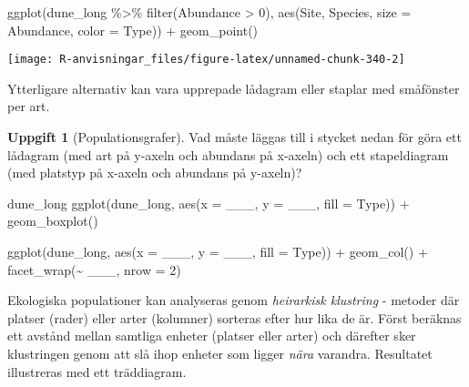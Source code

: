 \documentclass[
]{book}
\newenvironment{Shaded}{\begin{snugshade}}{\end{snugshade}}
\newcommand{\AttributeTok}[1]{\textcolor[rgb]{0.77,0.63,0.00}{#1}}
\newcommand{\DecValTok}[1]{\textcolor[rgb]{0.00,0.00,0.81}{#1}}
\newcommand{\FunctionTok}[1]{\textcolor[rgb]{0.00,0.00,0.00}{#1}}
\newcommand{\NormalTok}[1]{#1}
\newcommand{\SpecialCharTok}[1]{\textcolor[rgb]{0.00,0.00,0.00}{#1}}
\theoremstyle{definition}
\theoremstyle{definition}
\theoremstyle{definition}
\newtheorem{exercise}{Uppgift}[chapter]
\theoremstyle{definition}
\theoremstyle{remark}
\begin{document}
\begin{Shaded}
\begin{Highlighting}[]
\FunctionTok{ggplot}\NormalTok{(dune\_long }\SpecialCharTok{\%\textgreater{}\%} \FunctionTok{filter}\NormalTok{(Abundance }\SpecialCharTok{\textgreater{}} \DecValTok{0}\NormalTok{), }\FunctionTok{aes}\NormalTok{(Site, Species, }\AttributeTok{size =}\NormalTok{ Abundance, }\AttributeTok{color =}\NormalTok{ Type)) }\SpecialCharTok{+}
  \FunctionTok{geom\_point}\NormalTok{()}
\end{Highlighting}
\end{Shaded}

\begin{center}\texttt{[image: R-anvisningar\_files/figure-latex/unnamed-chunk-340-2]} \end{center}

Ytterligare alternativ kan vara upprepade lådagram eller staplar med småfönster per art.

\begin{exercise}[Populationsgrafer]

Vad måste läggas till i stycket nedan för göra ett lådagram (med art på y-axeln och abundans på x-axeln) och ett stapeldiagram (med platstyp på x-axeln och abundans på y-axeln)?

\begin{Shaded}
\begin{Highlighting}[]
\NormalTok{dune\_long}
\FunctionTok{ggplot}\NormalTok{(dune\_long, }\FunctionTok{aes}\NormalTok{(}\AttributeTok{x =}\NormalTok{ \_\_\_, }\AttributeTok{y =}\NormalTok{ \_\_\_, }\AttributeTok{fill =}\NormalTok{ Type)) }\SpecialCharTok{+}
  \FunctionTok{geom\_boxplot}\NormalTok{()}

\FunctionTok{ggplot}\NormalTok{(dune\_long, }\FunctionTok{aes}\NormalTok{(}\AttributeTok{x =}\NormalTok{ \_\_\_, }\AttributeTok{y =}\NormalTok{ \_\_\_, }\AttributeTok{fill =}\NormalTok{ Type)) }\SpecialCharTok{+}
  \FunctionTok{geom\_col}\NormalTok{() }\SpecialCharTok{+}
  \FunctionTok{facet\_wrap}\NormalTok{(}\SpecialCharTok{\textasciitilde{}}\NormalTok{ \_\_\_, }\AttributeTok{nrow =} \DecValTok{2}\NormalTok{)}
\end{Highlighting}
\end{Shaded}

\end{exercise}

Ekologiska populationer kan analyseras genom \emph{heirarkisk klustring} - metoder där platser (rader) eller arter (kolumner) sorteras efter hur lika de är. Först beräknas ett avstånd mellan samtliga enheter (platser eller arter) och därefter sker klustringen genom att slå ihop enheter som ligger \emph{nära} varandra. Resultatet illustreras med ett träddiagram.
\end{document}
